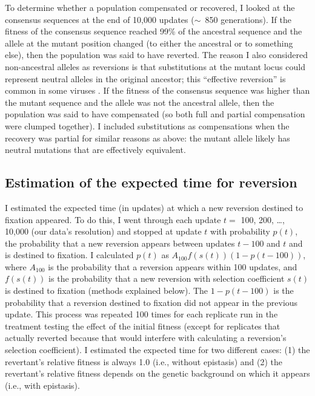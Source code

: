 \begin{doublespace}
To determine whether a population compensated or recovered,
I looked at the consensus sequences at the end of 10,000 updates
($\sim$~850 generations).
%
If the fitness of the consensus sequence reached 99\% of the
ancestral sequence and the allele at the mutant position
changed (to either the ancestral or to something else),
then the population was said to have reverted.
%
The reason I also considered non-ancestral alleles as reversions
is that substitutions at the mutant locus could represent
neutral alleles in the original ancestor;
this ``effective reversion'' is common in some viruses \citep{arg07}.
%
If the fitness of the consensus sequence was higher than the
mutant sequence and the allele was not the ancestral allele,
then the population was said to have compensated
(so both full and partial compensation were clumped together).
%
I included substitutions as compensations when the recovery
was partial for similar reasons as above: the mutant allele
likely has neutral mutations that are effectively equivalent.



\subsection{Estimation of the expected time for reversion}

I estimated the expected time (in updates) at which a new reversion
destined to fixation appeared.
%
To do this, I went through each update $t =$ 100, 200, \ldots, 10,000
(our data's resolution) and stopped at update $t$ with probability $p(t)$,
the probability that a new reversion appears between updates $t - 100$ and $t$
and is destined to fixation.
%
I calculated $p(t)$ as $A_{100} f(s(t))(1 - p(t - 100))$, where $A_{100}$
is the probability that a reversion appears within 100 updates,
and $f(s(t))$ is the probability that a new reversion with
selection coefficient $s(t)$ is destined to fixation (methods explained below).
%
The $1 - p(t - 100)$ is the probability that a reversion destined to fixation
did not appear in the previous update.
%
This process was repeated 100 times for each replicate run
in the treatment testing the effect of the initial fitness
(except for replicates that actually reverted because that would
interfere with calculating a reversion's selection coefficient).
%
I estimated the expected time for two different cases:
(1) the revertant's relative fitness is always 1.0 (i.e., without epistasis)
and (2) the revertant's relative fitness depends on the genetic background
on which it appears (i.e., with epistasis).




\end{doublespace}
